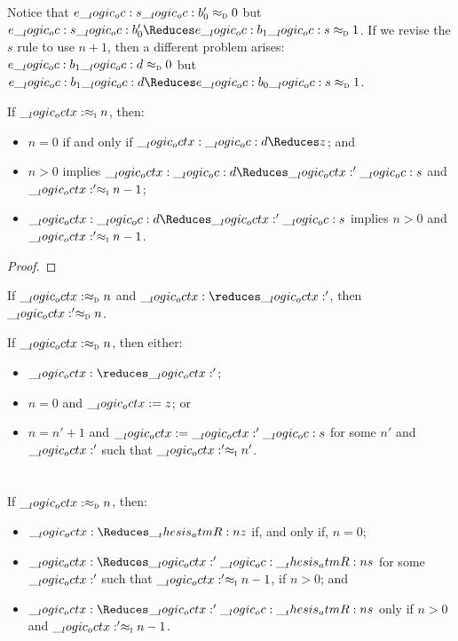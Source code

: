 Notice that $e \__logic_oc: s \__logic_oc: b'_0 \approx\sb{\text{\normalfont\scshape d}} 0$ but $e \oc s \oc b'_0 \Reduces \adec{e \oc b_1 \oc s}{1}$.
If we revise the $s$ rule to use $n+1$, then a different problem arises: $e \__logic_oc: b_1 \__logic_oc: d \approx\sb{\text{\normalfont\scshape d}} 0$ but $e \oc b_1 \oc d \Reduces \adec{e \oc b_0 \oc s}{1}$.

\begin{theorem}[Adequacy]
  If $\__logic_octx: \approx\sb{\text{\normalfont\scshape i}} n$, then:
  \begin{itemize}[nosep]
  \item $n = 0$ if and only if $\octx \oc d \Reduces z$; and
  \item $n > 0$ implies $\octx \oc d \Reduces \octx' \oc s$ and $\__logic_octx:' \approx\sb{\text{\normalfont\scshape i}} n-1$;
  \item $\octx \oc d \Reduces \octx' \oc s$ implies $n > 0$ and $\__logic_octx:' \approx\sb{\text{\normalfont\scshape i}} n-1$.
  \end{itemize}
\end{theorem}
%
\begin{proof}
  
\end{proof}

\begin{theorem}\leavevmode
  \begin{description}[nosep, font=\emph]
  \item[Preservation] If $\__logic_octx: \approx\sb{\text{\normalfont\scshape d}} n$ and $\octx \reduces \octx'$, then $\__logic_octx:' \approx\sb{\text{\normalfont\scshape d}} n$.
  \item[Progress] If $\__logic_octx: \approx\sb{\text{\normalfont\scshape d}} n$, then either:
    \begin{itemize}[nosep]
    \item $\octx \reduces \octx'$;
    \item $n = 0$ and $\__logic_octx: = z$; or
    \item $n = n'+1$ and $\__logic_octx: = \__logic_octx:' \__logic_oc: s$ for some $n'$ and $\__logic_octx:'$ such that $\__logic_octx:' \approx\sb{\text{\normalfont\scshape i}} n'$.
    \end{itemize}
  \end{description}
\end{theorem}



\section{}

\begin{corollary}
  If $\__logic_octx: \approx\sb{\text{\normalfont\scshape d}} n$, then:
  \begin{itemize}
  \item $\octx \Reduces \atmR{z}$ if, and only if, $n = 0$;
  \item $\octx \Reduces \octx' \oc \atmR{s}$ for some $\__logic_octx:'$ such that $\__logic_octx:' \approx\sb{\text{\normalfont\scshape i}} n-1$, if $n > 0$; and
  \item $\octx \Reduces \octx' \oc \atmR{s}$ only if $n > 0$ and $\__logic_octx:' \approx\sb{\text{\normalfont\scshape i}} n-1$.
  \end{itemize}
\end{corollary}




